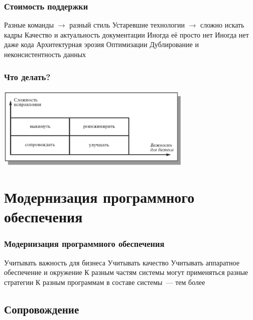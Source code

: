\documentclass{../../slides-style}
\begin{document}
    \begin{frame}
        \frametitle{Стоимость поддержки}
        \begin{outline}
            \1 Разные команды $\to$ разный стиль
            \1 Устаревшие технологии $\to$ сложно искать кадры
            \1 Качество и актуальность документации
                \2 Иногда её просто нет
                \2 Иногда нет даже кода
            \1 Архитектурная эрозия
            \1 Оптимизации
            \1 Дублирование и неконсистентность данных
        \end{outline}
    \end{frame}

    \begin{frame}
        \frametitle{Что делать?}
        \begin{center}
            \includegraphics[width=0.7\textwidth]{maintenanceWays.png}
        \end{center}
    \end{frame}

    \section{Модернизация программного обеспечения}

    \begin{frame}
        \frametitle{Модернизация программного обеспечения}
        \begin{outline}
            \1 Учитывать важность для бизнеса
            \1 Учитывать качество
            \1 Учитывать аппаратное обеспечение и окружение
            \1 К разным частям системы могут применяться разные стратегии
                \2 К разным программам в составе системы~--- тем более
        \end{outline}
    \end{frame}

    \subsection{Сопровождение}
\end{document}
